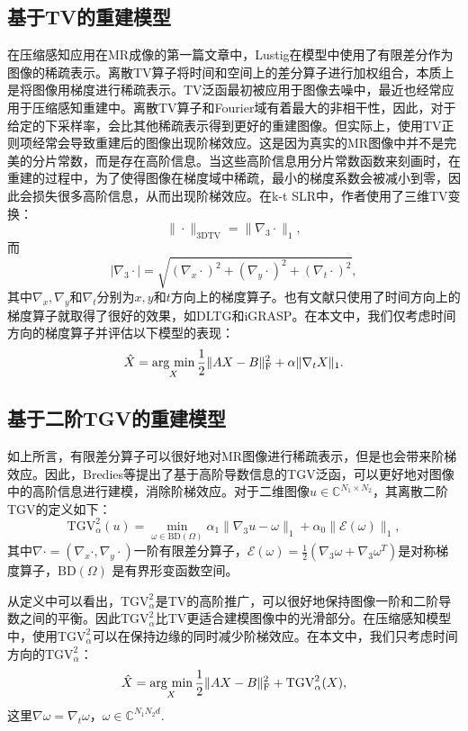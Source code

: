 \subsection{基于TV的重建模型}
在压缩感知应用在MR成像的第一篇文章中，Lustig\cite{Lustig2008Compressed}在模型中使用了有限差分作为图像的稀疏表示。离散TV算子将时间和空间上的差分算子进行加权组合，本质上是将图像用梯度进行稀疏表示。TV泛函最初被应用于图像去噪中\cite{rof}，最近也经常应用于压缩感知重建中。离散TV算子和Fourier域有着最大的非相干性，因此，对于给定的下采样率，会比其他稀疏表示得到更好的重建图像。但实际上，使用TV正则项经常会导致重建后的图像出现阶梯效应。这是因为真实的MR图像中并不是完美的分片常数，而是存在高阶信息。当这些高阶信息用分片常数函数来刻画时，在重建的过程中，为了使得图像在梯度域中稀疏，最小的梯度系数会被减小到零，因此会损失很多高阶信息，从而出现阶梯效应。在k-t SLR\cite{Sajan2011Accelerated}中，作者使用了三维TV变换：
$$\|\cdot\|_\mathrm{3DTV} = \|\nabla_3\cdot\|_1,$$
而
$$|\nabla_3\cdot|=\sqrt{(\nabla_x \cdot)^2 + (\nabla_y \cdot)^2 + (\nabla_t \cdot)^2},$$
其中$\nabla_x,\nabla_y$和$\nabla_t$分别为$x,y$和$t$方向上的梯度算子。也有文献只使用了时间方向上的梯度算子就取得了很好的效果，如DLTG\cite{caballero2014dictionary}和iGRASP\cite{igrasp}。在本文中，我们仅考虑时间方向的梯度算子并评估以下模型的表现：
\begin{equation}
\hat{X} = \argmin_X \frac{1}{2}\|AX-B\|_\mathrm{F}^2 + \alpha\|\nabla_t X\|_1.
\end{equation}

\subsection{基于二阶TGV的重建模型}
如上所言，有限差分算子可以很好地对MR图像进行稀疏表示，但是也会带来阶梯效应。因此，Bredies\cite{bredies2010total}等提出了基于高阶导数信息的TGV泛函，可以更好地对图像中的高阶信息进行建模，消除阶梯效应。对于二维图像$u\in \mathbb{C}^{N_1\times N_2}$，其离散二阶TGV的定义如下：
$$\mathrm{TGV}_\alpha^2(u)=\min_{\omega\in \mathrm{BD}(\Omega)}\alpha_1\|\nabla_3 u-\omega\|_1 + \alpha_0\|\mathcal{E}(\omega)\|_1,$$
其中$\nabla\cdot=(\nabla_x\cdot, \nabla_y\cdot)$一阶有限差分算子，$\mathcal{E}(\omega)=\frac{1}{2}(\nabla_3\omega+\nabla_3\omega^{T})$是对称梯度算子，$\mathrm{BD}(\Omega)$ 是有界形变函数空间。

从定义中可以看出，$\mathrm{TGV}_\alpha^2$是TV的高阶推广，可以很好地保持图像一阶和二阶导数之间的平衡。因此$\mathrm{TGV}_\alpha^2$比TV更适合建模图像中的光滑部分。在压缩感知模型中，使用$\mathrm{TGV}_\alpha^2$可以在保持边缘的同时减少阶梯效应。在本文中，我们只考虑时间方向的$\mathrm{TGV}_\alpha^2$：
\begin{equation}
\hat{X} = \argmin_X \frac{1}{2}\|AX-B\|_\mathrm{F}^2+\mathrm{TGV}_\alpha^2(X),
\end{equation}
这里$\nabla \omega = \nabla_t \omega$，$\omega\in \mathbb{C}^{N_1N_2d}$.

